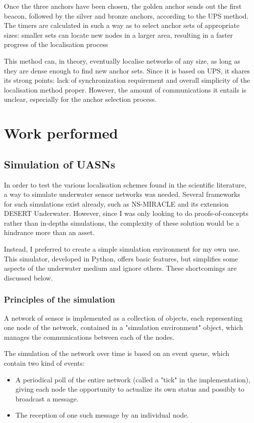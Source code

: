 \documentclass[12pt,a4paper,fleqn]{report}
\begin{document}
Once the three anchors have been chosen, the golden anchor sends out the first beacon, followed by the silver and bronze anchors, according to the UPS method. The timers are calculated in such a way as to select anchor sets of appropriate sizes: smaller sets can locate new nodes in a larger area, resulting in a faster progress of the localisation process

This method can, in theory, eventually localise networks of any size, as long as they are dense enough to find new anchor sets. Since it is based on UPS, it shares its strong points: lack of synchronization requirement and overall simplicity of the localisation method proper. However, the amount of communications it entails is unclear, especially for the anchor selection process.

\chapter{Work performed}

\section{Simulation of UASNs}

In order to test the various localisation schemes found in the scientific literature, a way to simulate underwater sensor networks was needed. Several frameworks for such simulations exist already, such as NS-MIRACLE and its extension DESERT Underwater. However, since I was only looking to do proofs-of-concepts rather than in-depths simulations, the complexity of these solution would be a hindrance more than an asset.

Instead, I preferred to create a simple simulation environment for my own use. This simulator, developed in Python, offers basic features, but simplifies some aspects of the underwater medium and ignore others. These shortcomings are discussed below.

\subsection{Principles of the simulation}

A network of sensor is implemented as a collection of objects, each representing one node of the network, contained in a "simulation environment" object, which manages the communications between each of the nodes.

The simulation of the network over time is based on an event queue, which contain two kind of events:
\begin{itemize}
	\itemsep0em
	\item A periodical poll of the entire network (called a "tick" in the implementation), giving each node the opportunity to actualize its own status and possibly to broadcast a message.
	\item The reception of one such message by an individual node.
\end{itemize}
\end{document}
